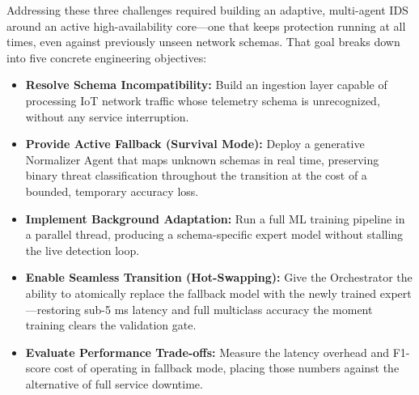 \documentclass[conference]{IEEEtran}
\begin{document}
Addressing these three challenges required building an adaptive, multi-agent IDS around an active high-availability core---one that keeps protection running at all times, even against previously unseen network schemas. That goal breaks down into five concrete engineering objectives:
\begin{itemize}
    \item \textbf{Resolve Schema Incompatibility:} Build an ingestion layer capable of processing IoT network traffic whose telemetry schema is unrecognized, without any service interruption.
    \item \textbf{Provide Active Fallback (Survival Mode):} Deploy a generative Normalizer Agent that maps unknown schemas in real time, preserving binary threat classification throughout the transition at the cost of a bounded, temporary accuracy loss.
    \item \textbf{Implement Background Adaptation:} Run a full ML training pipeline in a parallel thread, producing a schema-specific expert model without stalling the live detection loop.
    \item \textbf{Enable Seamless Transition (Hot-Swapping):} Give the Orchestrator the ability to atomically replace the fallback model with the newly trained expert---restoring sub-5 ms latency and full multiclass accuracy the moment training clears the validation gate.
    \item \textbf{Evaluate Performance Trade-offs:} Measure the latency overhead and F1-score cost of operating in fallback mode, placing those numbers against the alternative of full service downtime.
\end{itemize}
\end{document}

